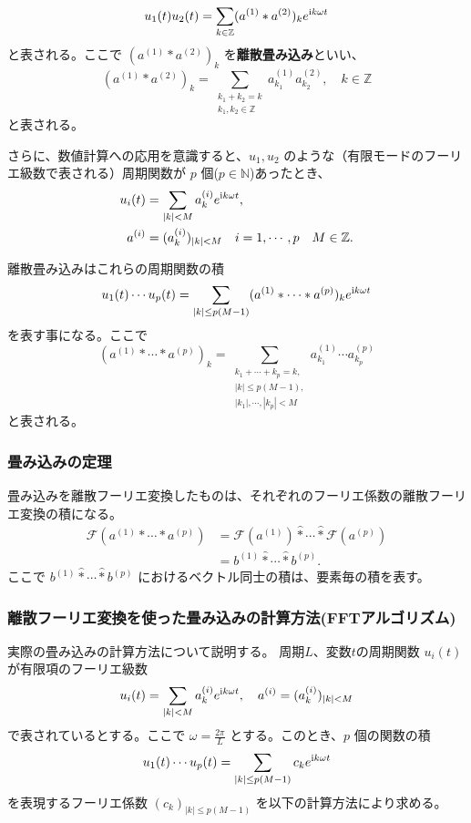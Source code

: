 $$
    u_1(t)u_2(t) = \sum_{k \in \mathbb{Z}} (a^{(1)}*a^{(2)})_{k}  e^{\mathrm{i} k\omega t}
$$
と表される。ここで $ (a^{(1)}*a^{(2)})_k$ を\textbf{離散畳み込み}といい、
$$
     (a^{(1)}*a^{(2)})_k = \sum_{\substack{k_1 + k_2 = k \\ k_1 , k_2 \in \mathbb{Z}}} a_{k_1}^{(1)} a_{k_2}^{(2)} , \quad k \in \mathbb{Z}
$$
と表される。


さらに、数値計算への応用を意識すると、$u_1, u_2$ のような（有限モードのフーリエ級数で表される）周期関数が $p$ 個($p \in \mathbb{N}$)あったとき、
\begin{align*}
    u_i(t) &= \sum_{|k| < M} a_{k}^{(i)} e^{\mathrm{i} k\omega t} , \\
a^{(i)} &= (a_{k}^{(i)})_{|k| < M} \quad i = 1 , \cdots ,p \quad M \in \mathbb{Z}.
\end{align*}

離散畳み込みはこれらの周期関数の積
$$
    u_1(t)\cdots u_p(t) = \sum_{|k| \leq p(M-1)}(a^{(1)}* \cdots *a^{(p)})_k e^{\mathrm{i} k\omega t}
$$
を表す事になる。ここで
\begin{equation*}
    (a^{(1)}* \cdots *a^{(p)})_k = \sum_{\substack{k_1 + \cdots + k_p = k,\\ |k| \leq p(M-1),  \\ |k_1| , \cdots ,|k_p|<M}} a_{k_1}^{(1)} \cdots  a_{k_p}^{(p)} 
\end{equation*}
と表される。

\subsubsection{畳み込みの定理}
畳み込みを離散フーリエ変換したものは、それぞれのフーリエ係数の離散フーリエ変換の積になる。
$$
\begin{aligned}
    \mathcal{F}(a^{(1)}* \cdots *a^{(p)}) &= \mathcal{F}(a^{(1)})\hat{\ast} \cdots \hat{\ast}\mathcal{F}(a^{(p)}) \\
    &= b^{(1)}\hat{\ast}\cdots \hat{\ast}b^{(p)} .
\end{aligned}
$$
ここで $ b^{(1)}\hat{\ast} \cdots \hat{\ast}b^{(p)}$ におけるベクトル同士の積は、要素毎の積を表す。

\subsubsection{離散フーリエ変換を使った畳み込みの計算方法(FFTアルゴリズム)\cite{convolution} }

実際の畳み込みの計算方法について説明する。
周期$L$、変数$t$の周期関数 $u_i(t)$ が有限項のフーリエ級数
$$
    u_i(t) = \sum_{|k|<M} a_{k}^{(i)} e^{\mathrm{i} k\omega t} , \quad a^{(i)} = (a_{k}^{(i)})_{|k|<M} 
$$
で表されているとする。ここで $\omega = \frac{2 \pi}{L}$ とする。このとき、$p$ 個の関数の積
$$
    u_1(t)\cdots u_p(t) = \sum_{|k| \leq p(M-1)}c_k e^{\mathrm{i} k\omega t}
$$
を表現するフーリエ係数 $(c_k)_{|k| \leq p(M-1)}$ を以下の計算方法により求める。

